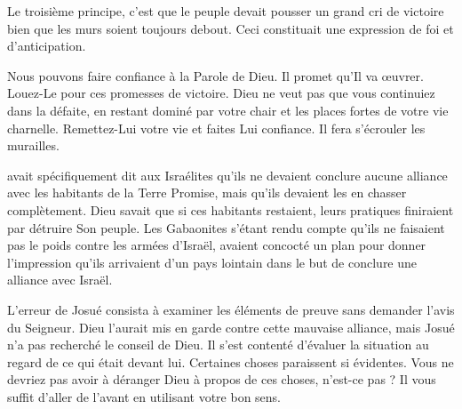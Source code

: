 

Le troisième principe, c'est que le peuple devait pousser
 un grand cri de victoire \ocadr bien que les murs soient toujours debout.
 Ceci constituait une expression de foi et d'anticipation.

Nous pouvons faire confiance à la Parole de Dieu. Il promet qu'Il va œuvrer.
 Louez-Le pour ces promesses de victoire.
 Dieu ne veut pas que vous continuiez dans la défaite,
 en restant dominé par votre chair et les places fortes de votre vie charnelle.
 Remettez-Lui votre vie et faites Lui confiance.
 Il fera s'écrouler les murailles. 

\dvrule






 avait spécifiquement dit aux Israélites
 qu'ils ne devaient conclure aucune alliance avec les habitants
 de la Terre Promise, mais qu'ils devaient les en chasser complètement.
 Dieu savait que si ces habitants restaient, leurs pratiques finiraient
 par détruire Son peuple.
 Les Gabaonites s'étant rendu compte qu'ils ne faisaient
 pas le poids contre les armées d'Israël,
 avaient concocté un plan pour donner l'impression
 qu'ils arrivaient d'un pays lointain
 dans le but de conclure une alliance avec Israël.

L'erreur de Josué consista à examiner les éléments de preuve
 sans demander l'avis du Seigneur.
 Dieu l'aurait mis en garde contre cette mauvaise alliance,
 mais Josué n'a pas recherché le conseil de Dieu.
 Il s'est contenté d'évaluer la situation au regard de ce qui était devant lui.
 Certaines choses paraissent si évidentes.
 Vous ne devriez pas avoir à déranger Dieu à propos de ces choses,
 n'est-ce pas ? 
 Il vous suffit d'aller de l'avant en utilisant votre bon sens.

